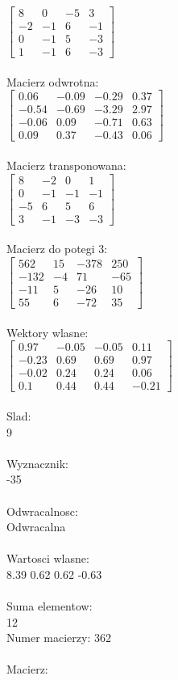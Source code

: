 \documentclass[a4paper,12pt]{article}
\begin{document}
$\begin{bmatrix} 8&0&-5&3\\-2&-1&6&-1\\0&-1&5&-3\\1&-1&6&-3 \end{bmatrix}$
\\
\\
Macierz odwrotna:\\

$\begin{bmatrix} 0.06&-0.09&-0.29&0.37\\-0.54&-0.69&-3.29&2.97\\-0.06&0.09&-0.71&0.63\\0.09&0.37&-0.43&0.06 \end{bmatrix}$
\\
\\
Macierz transponowana:\\

$\begin{bmatrix} 8&-2&0&1\\0&-1&-1&-1\\-5&6&5&6\\3&-1&-3&-3 \end{bmatrix}$
\\
\\
Macierz do potegi 3:\\

$\begin{bmatrix} 562&15&-378&250\\-132&-4&71&-65\\-11&5&-26&10\\55&6&-72&35 \end{bmatrix}$
\\
\\
Wektory wlasne:\\

$\begin{bmatrix} 0.97&-0.05&-0.05&0.11\\-0.23&0.69&0.69&0.97\\-0.02&0.24&0.24&0.06\\0.1&0.44&0.44&-0.21 \end{bmatrix}$
\\
\\
Slad:\\
9
\\
\\
Wyznacznik:\\
-35
\\
\\
Odwracalnosc:\\
Odwracalna
\\
\\
Wartosci wlasne:\\
8.39 0.62 0.62 -0.63
\\
\\
Suma elementow:\\
12
\\
\newpage
Numer macierzy:
362
\\
\\
Macierz:\\
\end{document}

